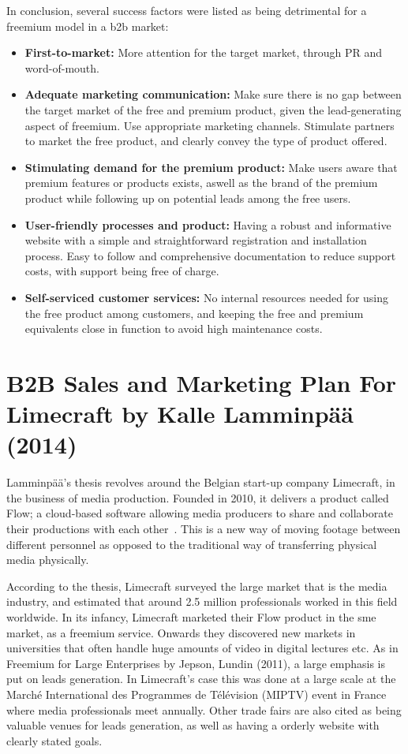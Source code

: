In conclusion, several success factors were listed as being detrimental for a freemium model in a \gls{b2b} market:
\begin{itemize}
    \item \textbf{First-to-market: }More attention for the target market, through PR and word-of-mouth. 
    \item \textbf{Adequate marketing communication: }Make sure there is no gap between the target market of the free and premium product, given the lead-generating aspect of freemium. Use appropriate marketing channels. Stimulate partners to market the free product, and clearly convey the type of product offered.
    \item \textbf{Stimulating demand for the premium product: }Make users aware that premium features or products exists, aswell as the brand of the premium product while following up on potential leads among the free users. 
    \item \textbf{User-friendly processes and product: }Having a robust and informative website with a simple and straightforward registration and installation process. Easy to follow and comprehensive documentation to reduce support costs, with support being free of charge.
    \item \textbf{Self-serviced customer services: }No internal resources needed for using the free product among customers, and keeping the free and premium equivalents close in function to avoid high maintenance costs. 
\end{itemize}

\section{B2B Sales and Marketing Plan For Limecraft by Kalle Lamminpää (2014)}
Lamminpää's thesis revolves around the Belgian start-up company Limecraft, in the business of media production. Founded in 2010, it delivers a product called Flow; a cloud-based software allowing media producers to share and collaborate their productions with each other~\cite{lamminpaa2014b2b}. This is a new way of moving footage between different personnel as opposed to the traditional way of transferring physical media physically. 


According to the thesis, Limecraft surveyed the large market that is the media industry, and estimated that around 2.5 million professionals worked in this field worldwide. In its infancy, Limecraft marketed their Flow product in the \gls{sme} market, as a freemium service. Onwards they discovered new markets in universities that often handle huge amounts of video in digital lectures etc. As in Freemium for Large Enterprises by Jepson, Lundin (2011), a large emphasis is put on leads generation. In Limecraft's case this was done at a large scale at the  Marché International des Programmes de Télévision (MIPTV) event in France where media professionals meet annually. Other trade fairs are also cited as being valuable venues for leads generation, as well as having a orderly website with clearly stated goals. 



